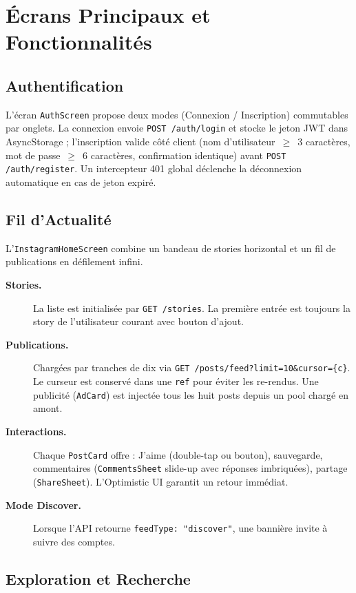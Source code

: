 \chapter{Écrans Principaux et Fonctionnalités}

\section{Authentification}

L'écran \texttt{AuthScreen} propose deux modes (Connexion / Inscription) commutables par onglets. La connexion envoie \texttt{POST /auth/login} et stocke le jeton JWT dans AsyncStorage ; l'inscription valide côté client (nom d'utilisateur~$\geq$~3 caractères, mot de passe~$\geq$~6 caractères, confirmation identique) avant \texttt{POST /auth/register}. Un intercepteur 401 global déclenche la déconnexion automatique en cas de jeton expiré.

\section{Fil d'Actualité}

L'\texttt{InstagramHomeScreen} combine un bandeau de stories horizontal et un fil de publications en défilement infini.

\begin{description}
  \item[\textbf{Stories.}] La liste est initialisée par \texttt{GET /stories}. La première entrée est toujours la story de l'utilisateur courant avec bouton d'ajout.
  \item[\textbf{Publications.}] Chargées par tranches de dix via \texttt{GET /posts/feed?limit=10\&cursor=\{c\}}. Le curseur est conservé dans une \texttt{ref} pour éviter les re-rendus. Une publicité (\texttt{AdCard}) est injectée tous les huit posts depuis un pool chargé en amont.
  \item[\textbf{Interactions.}] Chaque \texttt{PostCard} offre : J'aime (double-tap ou bouton), sauvegarde, commentaires (\texttt{CommentsSheet} slide-up avec réponses imbriquées), partage (\texttt{ShareSheet}). L'Optimistic UI garantit un retour immédiat.
  \item[\textbf{Mode Discover.}] Lorsque l'API retourne \texttt{feedType: "discover"}, une bannière invite à suivre des comptes.
\end{description}

\section{Exploration et Recherche}

